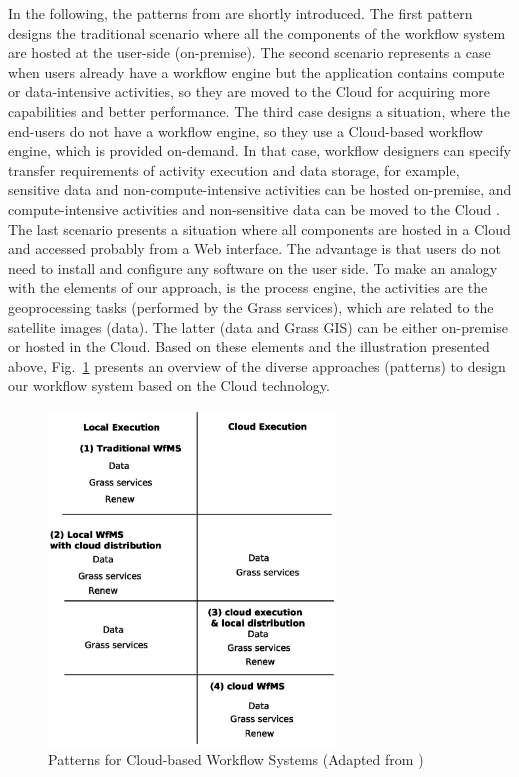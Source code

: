 %
%
%
%
In the following, the patterns from \cite{han10,leyman09} are shortly introduced.
%
%
%
The first pattern designs the traditional scenario where all the components of the workflow system are hosted at the user-side (on-premise).
%
The second scenario represents a case when users already have a workflow engine but the application contains compute or data-intensive activities, so they are moved to the Cloud for acquiring more capabilities and better performance.
%
The third case designs a situation, where the end-users do not have a workflow engine, so they use a Cloud-based workflow engine, which is provided on-demand.
%
In that case, workflow designers can specify transfer requirements of activity execution and data storage, for example, sensitive data and non-compute-intensive activities can be hosted on-premise, and compute-intensive activities and non-sensitive data can be moved to the Cloud \cite{han10}.
%
%
The last scenario presents a situation where all components are hosted in a Cloud and accessed probably from a Web interface.
%
The advantage is that users do not need to install and configure any software on the user side.
%
%
%
%
%
To make an analogy with the elements of our approach, \Renew{} is the process engine, the activities are the geoprocessing tasks (performed by the Grass services), which are related to the satellite images (data).
%
The latter (data and Grass GIS) can be either on-premise or hosted in the Cloud.
%
Based on these elements and the illustration presented above, Fig.~\ref{fig:cloudpatterns} presents an overview of the diverse approaches (patterns) to design our workflow system based on the Cloud technology.
%
\begin{figure}[!t]
    \centering
 \includegraphics[width=0.68\textwidth,height=0.35\textheight]{CloudGrassPatterns}
\caption{Patterns for Cloud-based Workflow Systems (Adapted from \cite{han10})}
\label{fig:cloudpatterns}
\end{figure}



